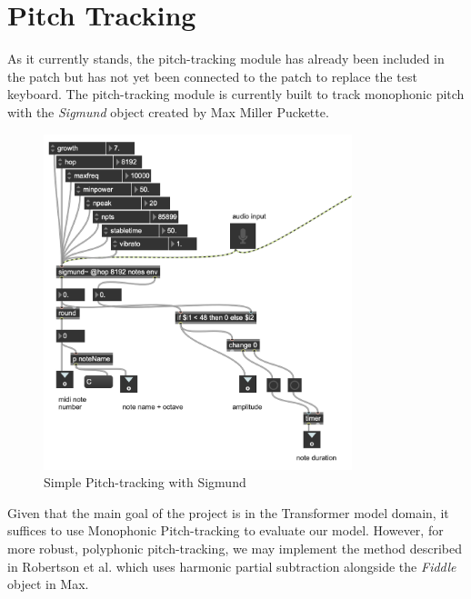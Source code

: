 \documentclass[../main.tex]{subfiles}
\begin{document}
\section{Pitch Tracking}
As it currently stands, the pitch-tracking module has already been included in the patch but has not yet been connected to the patch to replace the test keyboard. The pitch-tracking module is currently built to track monophonic pitch with the \textit{Sigmund} object created by Max Miller Puckette. 

\begin{figure}[htpb]
    \centering
    \includegraphics[width=0.8\textwidth]{imgs/pitchtracking_module.png}
    \caption{Simple Pitch-tracking with Sigmund}
    \label{fig:pitch_tracking}
\end{figure}

Given that the main goal of the project is in the Transformer model domain, it suffices to use Monophonic Pitch-tracking to evaluate our model. However, for more robust, polyphonic pitch-tracking, we may implement the method described in Robertson et al. \cite{Robertson:1} which uses harmonic partial subtraction alongside the \textit{Fiddle} object in Max.
\end{document}
